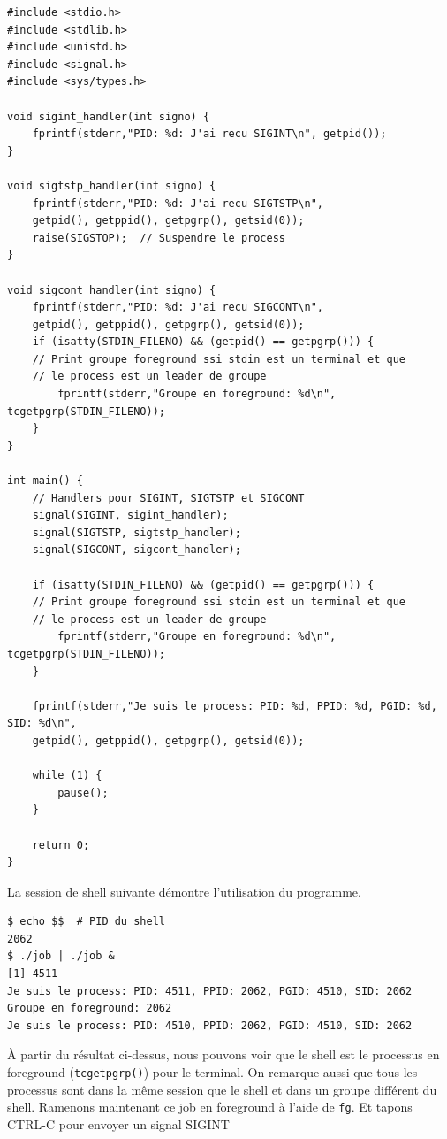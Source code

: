 \begin{lstlisting}[caption={jobControl.c}, label={jobControl.c}]
#include <stdio.h>
#include <stdlib.h>
#include <unistd.h>
#include <signal.h>
#include <sys/types.h>

void sigint_handler(int signo) {
	fprintf(stderr,"PID: %d: J'ai recu SIGINT\n", getpid());
}

void sigtstp_handler(int signo) {
	fprintf(stderr,"PID: %d: J'ai recu SIGTSTP\n",
    getpid(), getppid(), getpgrp(), getsid(0));
	raise(SIGSTOP);  // Suspendre le process
}

void sigcont_handler(int signo) {
	fprintf(stderr,"PID: %d: J'ai recu SIGCONT\n",
    getpid(), getppid(), getpgrp(), getsid(0));
	if (isatty(STDIN_FILENO) && (getpid() == getpgrp())) {
    // Print groupe foreground ssi stdin est un terminal et que
    // le process est un leader de groupe
    	fprintf(stderr,"Groupe en foreground: %d\n", tcgetpgrp(STDIN_FILENO));
	}
}

int main() {
	// Handlers pour SIGINT, SIGTSTP et SIGCONT
	signal(SIGINT, sigint_handler);
	signal(SIGTSTP, sigtstp_handler);
	signal(SIGCONT, sigcont_handler);

    if (isatty(STDIN_FILENO) && (getpid() == getpgrp())) {
    // Print groupe foreground ssi stdin est un terminal et que
    // le process est un leader de groupe
    	fprintf(stderr,"Groupe en foreground: %d\n", tcgetpgrp(STDIN_FILENO));
	}

	fprintf(stderr,"Je suis le process: PID: %d, PPID: %d, PGID: %d, SID: %d\n",
    getpid(), getppid(), getpgrp(), getsid(0));

	while (1) {
    	pause();
	}

	return 0;
}
\end{lstlisting}

La session de shell suivante démontre l'utilisation du programme.
\newline

\begin{lstlisting}[style=blackstyle]
$ echo $$  # PID du shell
2062
$ ./job | ./job & 
[1] 4511
Je suis le process: PID: 4511, PPID: 2062, PGID: 4510, SID: 2062
Groupe en foreground: 2062
Je suis le process: PID: 4510, PPID: 2062, PGID: 4510, SID: 2062
\end{lstlisting}

À partir du résultat ci-dessus, nous pouvons voir que le shell est le processus en foreground (\texttt{tcgetpgrp()})
pour le terminal. On remarque aussi que tous les processus sont dans la même session que le shell et dans un groupe différent du shell.
\newline
Ramenons maintenant ce job en foreground à l'aide de \texttt{fg}. Et tapons CTRL-C pour envoyer un signal SIGINT

